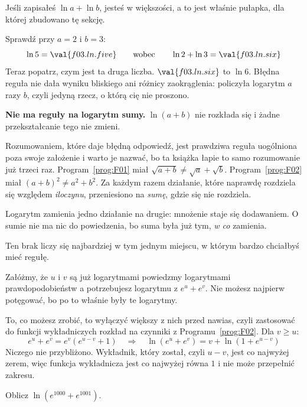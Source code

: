 \begin{fr}
\begin{ansblock}
Jeśli zapisałeś $\ln a + \ln b$, jesteś w większości, a to jest właśnie
pułapka, dla której zbudowano tę sekcję.

Sprawdź przy $a = 2$ i $b = 3$:
\[ \ln 5 = \val{f03.ln.five} \qquad \text{wobec} \qquad
   \ln 2 + \ln 3 = \val{f03.ln.six} \]
Teraz popatrz, czym jest ta druga liczba. $\val{f03.ln.six}$ to $\ln 6$. Błędna
reguła nie dała wyniku bliskiego ani różnicy zaokrąglenia: policzyła logarytm
$a$ razy $b$, czyli jedyną rzecz, o którą cię nie proszono.
\end{ansblock}

\begin{trapbox}
\textbf{Nie ma reguły na logarytm sumy.} $\ln(a+b)$ nie rozkłada się i żadne
przekształcanie tego nie zmieni.

Rozumowaniem, które daje błędną odpowiedź, jest prawdziwa reguła uogólniona
poza swoje założenie \dash{} i warto je nazwać, bo ta książka łapie to samo
rozumowanie już trzeci raz. Program~\ref{prog:F01} miał
$\sqrt{a+b} \ne \sqrt{a} + \sqrt{b}$. Program~\ref{prog:F02} miał
$(a+b)^{2} \ne a^{2} + b^{2}$. Za każdym razem działanie, które naprawdę
rozdziela się względem \emph{iloczynu}, przeniesiono na \emph{sumę}, gdzie się
nie rozdziela.

Logarytm zamienia jedno działanie na drugie: mnożenie staje się dodawaniem.
O sumie nie ma nic do powiedzenia, bo suma była już tym, \emph{w co} zamienia.
\end{trapbox}
\end{fr}

\begin{fr}
Ten brak liczy się najbardziej w tym jednym miejscu, w którym bardzo chciałbyś
mieć regułę.

Załóżmy, że $u$ i $v$ są już logarytmami \dash{} powiedzmy logarytmami
prawdopodobieństw \dash{} a potrzebujesz logarytmu z $e^{u} + e^{v}$. Nie
możesz najpierw potęgować, bo po to właśnie były te logarytmy.

To, co możesz zrobić, to wyłączyć większy z nich przed nawias, czyli
zastosować do funkcji wykładniczych rozkład na czynniki z
Programu~\ref{prog:F02}. Dla $v \ge u$:
\[ e^{u} + e^{v} = e^{v}\left(e^{u-v} + 1\right)
   \quad\Longrightarrow\quad
   \ln\!\left(e^{u} + e^{v}\right) = v + \ln\!\left(1 + e^{u-v}\right) \]
Niczego nie przybliżono. Wykładnik, który został, czyli $u - v$, jest co
najwyżej zerem, więc funkcja wykładnicza jest co najwyżej równa $1$ i nie może
przepełnić zakresu.

Oblicz $\ln\!\left(e^{1000} + e^{1001}\right)$.
\nextframe
\end{fr}

